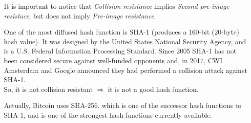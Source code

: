 It is important to notice that \textit{Collision resistance} implies \textit{Second pre-image resistace}, but does not imply \textit{Pre-image resistance}.
\begin{example}
	One of the most diffused hash function is SHA-1 (produces a 160-bit (20-byte) hash value). It was designed by the United States National Security Agency, and is a U.S. Federal Information Processing Standard. Since 2005 SHA-1 has not been considered secure against well-funded opponents and, in 2017, CWI Amsterdam and Google announced they had performed a collision attack against SHA-1.\\
	So, it is not collision resistant $\Rightarrow$ it is not a good hash function.
\end{example}

Actually, Bitcoin uses SHA-256, which is one of the successor hash functions to SHA-1, and is one of the strongest hash functions currently available.
